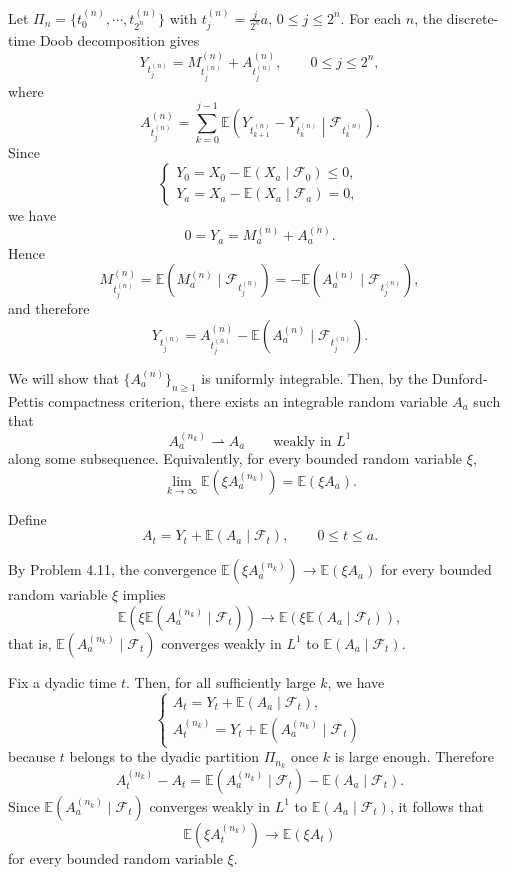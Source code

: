 {    Let $\Pi_n = \{t_0^{(n)},\cdots, t_{2^n}^{(n)}\}$ with $t_j^{(n)} = \frac{j}{2^n}a$, $0 \leq j \leq 2^n$. For each $n$, the discrete-time Doob decomposition gives
    $$
        Y_{t_{j}^{(n)}} = M_{t_{j}^{(n)}}^{(n)} + A_{t_j^{(n)}}^{(n)}, \qquad 0 \leq j \leq 2^n,
    $$
    where
    $$
        A_{t_j^{(n)}}^{(n)} = \sum_{k=0}^{j-1}\mathbb{E}\left( Y_{t_{k+1}^{(n)}} - Y_{t_{k}^{(n)}} \middle| \mathcal{F}_{t_{k}^{(n)}}\right).
    $$
    Since
    $$
    \begin{cases}
        Y_0 = X_0 - \mathbb{E}(X_a \mid \mathcal{F}_0) \leq 0,\\
        Y_a = X_a - \mathbb{E}(X_a \mid \mathcal{F}_a) = 0,
    \end{cases}
    $$
    we have
    $$
        0 = Y_a = M_a^{(n)} + A_a^{(n)}.
    $$
    Hence
    $$
        M_{t_{j}^{(n)}}^{(n)} = \mathbb{E}(M_a^{(n)} \mid \mathcal{F}_{t_{j}^{(n)}}) = - \mathbb{E}(A_a^{(n)} \mid \mathcal{F}_{t_{j}^{(n)}}),
    $$
    and therefore
    $$
        Y_{t_{j}^{(n)}} = A_{t_{j}^{(n)}}^{(n)} - \mathbb{E}(A_a^{(n)} \mid \mathcal{F}_{t_{j}^{(n)}}).
    $$

    We will show that $\{A_a^{(n)}\}_{n \geq 1}$ is uniformly integrable. Then, by the Dunford-Pettis compactness criterion, there exists an integrable random variable $A_a$ such that
    $$
        A_a^{(n_k)} \rightharpoonup A_a
        \qquad \text{weakly in } L^1
    $$
    along some subsequence. Equivalently, for every bounded random variable $\xi$,
    $$
        \lim_{k \to \infty} \mathbb{E}(\xi A_a^{(n_k)}) = \mathbb{E}(\xi A_a).
    $$

    Define
    $$
        A_t = Y_t + \mathbb{E}(A_a \mid \mathcal{F}_t), \qquad 0 \leq t \leq a.
    $$

    By Problem 4.11, the convergence $\mathbb{E}(\xi A_a^{(n_k)}) \to \mathbb{E}(\xi A_a)$ for every bounded random variable $\xi$ implies
    $$
        \mathbb{E}(\xi \mathbb{E}(A_a^{(n_k)} \mid \mathcal{F}_t)) \to \mathbb{E}(\xi \mathbb{E}(A_a \mid \mathcal{F}_t)),
    $$
    that is, $\mathbb{E}(A_a^{(n_k)} \mid \mathcal{F}_t)$ converges weakly in $L^1$ to $\mathbb{E}(A_a \mid \mathcal{F}_t)$.

    Fix a dyadic time $t$. Then, for all sufficiently large $k$, we have
    $$
    \begin{cases}
        A_t = Y_t + \mathbb{E}(A_a \mid \mathcal{F}_t), \\
        A_t^{(n_k)} = Y_t + \mathbb{E}(A_a^{(n_k)} \mid \mathcal{F}_t)
    \end{cases}
    $$
    because $t$ belongs to the dyadic partition $\Pi_{n_k}$ once $k$ is large enough.
    Therefore
    $$
        A_t^{(n_k)} - A_t = \mathbb{E}(A_a^{(n_k)} \mid \mathcal{F}_t) - \mathbb{E}(A_a \mid \mathcal{F}_t).
    $$
    Since $\mathbb{E}(A_a^{(n_k)} \mid \mathcal{F}_t)$ converges weakly in $L^1$ to $\mathbb{E}(A_a \mid \mathcal{F}_t)$, it follows that
    $$
        \mathbb{E}(\xi A_t^{(n_k)}) \to \mathbb{E}(\xi A_t)
    $$
    for every bounded random variable $\xi$. 

}
